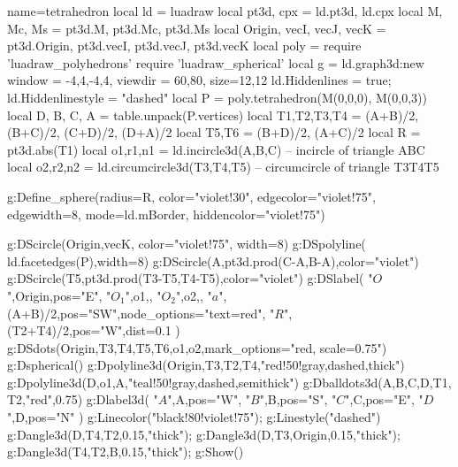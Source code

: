 \documentclass{standalone}
\begin{document}
\begin{luadraw}{name=tetrahedron}
local ld = luadraw
local pt3d, cpx = ld.pt3d, ld.cpx
local M, Mc, Ms = pt3d.M, pt3d.Mc, pt3d.Ms
local Origin, vecI, vecJ, vecK = pt3d.Origin, pt3d.vecI, pt3d.vecJ, pt3d.vecK
local poly = require 'luadraw_polyhedrons'
require 'luadraw_spherical'
local g = ld.graph3d:new{ window = {-4,4,-4,4}, viewdir = {60,80}, size={12,12} }
ld.Hiddenlines = true; ld.Hiddenlinestyle = "dashed"
local P = poly.tetrahedron(M(0,0,0), M(0,0,3))
local D, B, C, A = table.unpack(P.vertices)
local T1,T2,T3,T4 = (A+B)/2, (B+C)/2, (C+D)/2, (D+A)/2
local T5,T6 = (B+D)/2, (A+C)/2
local R = pt3d.abs(T1)
local o1,r1,n1 = ld.incircle3d(A,B,C) -- incircle of triangle ABC
local o2,r2,n2 = ld.circumcircle3d(T3,T4,T5) -- circumcircle of triangle T3T4T5

g:Define_sphere({radius=R, color="violet!30", edgecolor="violet!75", edgewidth=8, 
    mode=ld.mBorder, hiddencolor="violet!75"})

g:DScircle({Origin,vecK}, {color="violet!75", width=8})
g:DSpolyline( ld.facetedges(P),{width=8})
g:DScircle({A,pt3d.prod(C-A,B-A)},{color="violet"})
g:DScircle({T5,pt3d.prod(T3-T5,T4-T5)},{color="violet"})
g:DSlabel(
    "$O$",Origin,{pos="E"},
    "$O_1$",o1,{},
    "$O_2$",o2,{},
    "$a$",(A+B)/2,{pos="SW",node_options="text=red"},
    "$R$",(T2+T4)/2,{pos="W",dist=0.1}
)
g:DSdots({Origin,T3,T4,T5,T6,o1,o2},{mark_options="red, scale=0.75"})
g:Dspherical()
g:Dpolyline3d({{Origin,T3},{T2,T4}},"red!50!gray,dashed,thick")
g:Dpolyline3d({D,o1,A},"teal!50!gray,dashed,semithick")
g:Dballdots3d({A,B,C,D,T1, T2},"red",0.75)
g:Dlabel3d(
    "$A$",A,{pos="W"},
    "$B$",B,{pos="S"},
    "$C$",C,{pos="E"},
    "$D$",D,{pos="N"}
)
g:Linecolor("black!80!violet!75"); g:Linestyle("dashed")
g:Dangle3d(D,T4,T2,0.15,"thick"); g:Dangle3d(D,T3,Origin,0.15,"thick"); g:Dangle3d(T4,T2,B,0.15,"thick");
g:Show()
\end{luadraw}
\end{document}
